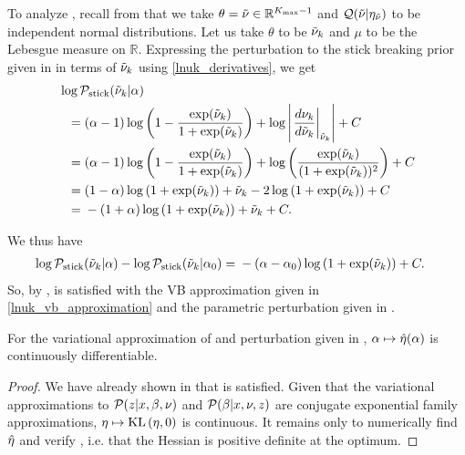 \begin{ex}
%
To analyze , recall from  that we
take $\theta = \tilde{\nu} \in \mathbb{R}^{{K_{\mathrm{max}}} - 1}$ and $\mathcal{Q}(\tilde{\nu} \vert \eta_{\tilde{\nu}})$ to
be independent normal distributions.  Let us take $\theta$ to be $\tilde{\nu}_{k}$ and
$\mu$ to be the Lebesgue measure on $\mathbb{R}$.  Expressing the perturbation
to the stick breaking prior given in  in terms of
$\tilde{\nu}_{k}$ using \eqref{lnuk_derivatives}, we get
%
\begin{align*}
%
\MoveEqLeft
\log \pstick(\lnuk \vert \alpha)
\\={}&
%
(\alpha - 1) \log\left(1 - \frac{\exp(\lnuk)}{1 + \exp(\lnuk)}\right) +
\log \abs{\fracat{d \nuk}{d \lnuk}{\lnuk}} +
\const
\\={}&
(\alpha - 1) \log\left(1 - \frac{\exp(\lnuk)}{1 + \exp(\lnuk)}\right) +
\log\left(\frac{\exp(\lnuk)}{(1 + \exp(\lnuk))^2}\right) +
    \const
\\={}&
(1 - \alpha) \log\left(1 + \exp(\lnuk)\right) +
\lnuk - 2 \log\left(1 + \exp(\lnuk)\right) + \const
\\={}&
-(1 + \alpha) \log\left(1 + \exp(\lnuk)\right) + \lnuk + \const.
%
\end{align*}

We thus have
%
\begin{align*}
%
\log \pstick(\lnuk \vert \alpha) - \log \pstick(\lnuk \vert \alpha_0)
={}&
    -(\alpha - \alpha_0) \log\left(1 + \exp(\lnuk)\right) + \const.
%
\end{align*}
%
So, by ,  is satisfied with
the VB approximation given in \eqref{lnuk_vb_approximation} and the parametric
perturbation given in .
%
\end{ex}




\begin{cor}
%
For the variational approximation of  and perturbation
given in , $\alpha \mapsto \hat\eta(\alpha)$
is continuously differentiable.
%
\begin{proof}
%
We have already shown in  that  is
satisfied.  Given that the variational approximations to $\mathcal{P}(z \vert x, \beta,
\nu)$ and $\mathcal{P}(\beta \vert x, \nu, z)$ are conjugate exponential family
approximations, $\eta \mapsto \mathrm{KL}\left(\eta, 0\right)$ is continuous.  It remains only to
numerically find $\hat\eta$ and verify , i.e.
that the Hessian is positive definite at the optimum.
%
\end{proof}
%
\end{cor}

